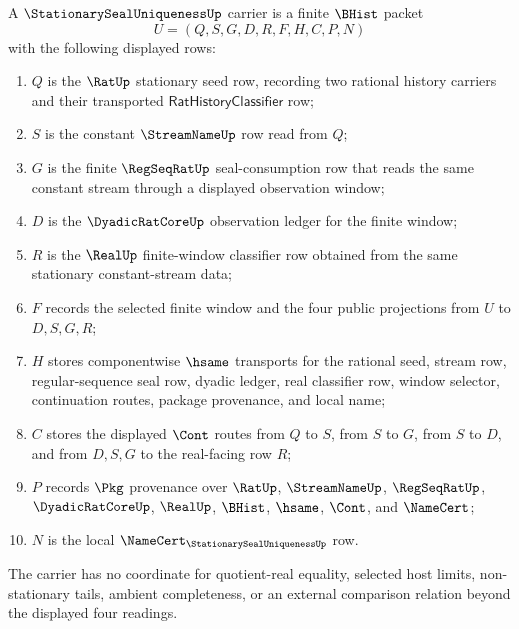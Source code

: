 \begin{definition}
\label{def:stationary-seal-uniqueness-carrier}
A $\StationarySealUniquenessUp$ carrier is a finite $\BHist$ packet
$$
U=(Q,S,G,D,R,F,H,C,P,N)
$$
with the following displayed rows:
\begin{enumerate}
\item $Q$ is the $\RatUp$ stationary seed row, recording two rational history carriers and their transported $\mathsf{RatHistoryClassifier}$ row;
\item $S$ is the constant $\StreamNameUp$ row read from $Q$;
\item $G$ is the finite $\RegSeqRatUp$ seal-consumption row that reads the same constant stream through a displayed observation window;
\item $D$ is the $\DyadicRatCoreUp$ observation ledger for the finite window;
\item $R$ is the $\RealUp$ finite-window classifier row obtained from the same stationary constant-stream data;
\item $F$ records the selected finite window and the four public projections from $U$ to $D,S,G,R$;
\item $H$ stores componentwise $\hsame$ transports for the rational seed, stream row, regular-sequence seal row, dyadic ledger, real classifier row, window selector, continuation routes, package provenance, and local name;
\item $C$ stores the displayed $\Cont$ routes from $Q$ to $S$, from $S$ to $G$, from $S$ to $D$, and from $D,S,G$ to the real-facing row $R$;
\item $P$ records $\Pkg$ provenance over $\RatUp$, $\StreamNameUp$, $\RegSeqRatUp$, $\DyadicRatCoreUp$, $\RealUp$, $\BHist$, $\hsame$, $\Cont$, and $\NameCert$;
\item $N$ is the local $\NameCert_{\StationarySealUniquenessUp}$ row.
\end{enumerate}
The carrier has no coordinate for quotient-real equality, selected host limits, non-stationary tails, ambient completeness, or an external comparison relation beyond the displayed four readings.
\end{definition}

